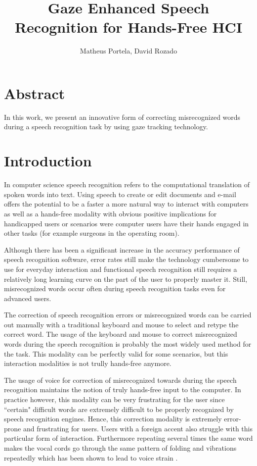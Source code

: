 \documentclass[]{article}
\title{Gaze Enhanced Speech Recognition for Hands-Free HCI}
\author{Matheus Portela, David Rozado}
\begin{document}
\maketitle

\section{Abstract}

In this work, we present an innovative form of correcting misrecognized words during a speech recognition task by using
gaze tracking technology. 


\section{Introduction}
In computer science speech recognition refers to the computational translation of spoken words into text.
Using speech to create or edit documents and e-mail offers the potential to be a faster a more natural way to interact
with computers as well as a hands-free modality with obvious positive implications for handicapped users or
scenarios were computer users have their hands engaged in other tasks (for example surgeons in the operating room).

Although there has been a significant increase in the accuracy performance of speech recognition software, error
rates still make the technology cumbersome to use for everyday interaction and functional speech recognition still
requires a relatively long learning curve on the part of the user to properly master it. Still, misrecognized words
occur often during speech recognition tasks even for advanced users. 

The correction of speech recognition errors or misrecognized words can be carried out manually with a traditional
keyboard and mouse to select and retype the correct word. The usage  of the keyboard and mouse to correct misrecognized
words  during the speech recognition is probably  the most widely used  method for the task. This modality can be
perfectly valid for some scenarios, but this interaction modalities is not trully hands-free anymore.


The usage of voice for correction of misrecognized towards  during the speech recognition maintains the notion of truly
hands-free input to the computer. In practice however, this modality can be very frustrating for the user since
``certain" difficult words are extremely difficult to be properly recognized by speech recognition engines. Hence, this
correction modality is extremely error-prone and frustrating for users. Users with a foreign accent also struggle with
this particular form of interaction. Furthermore repeating several times the same word makes the vocal cords go through
the same pattern of folding and vibrations repeatedly which has been shown to lead to voice strain \cite{}.
\end{document}
